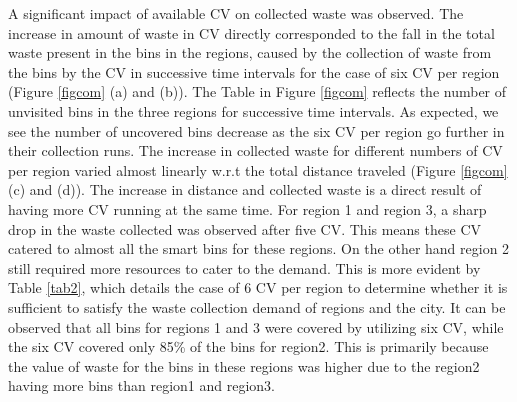 \documentclass[12pt]{article}
\begin{document}
A significant impact of available CV on collected waste was observed. The increase in amount of waste in CV directly corresponded to the fall in the total waste present in the bins in the regions, caused by the collection of waste from the bins by the CV in successive time intervals for the case of six CV per region (Figure \ref{figcom} (a) and (b)). The Table in Figure \ref{figcom} reflects the number of unvisited bins in the three regions for successive time intervals. As expected, we see the number of uncovered bins decrease as the six CV per region go further in their collection runs. The increase in collected waste for different numbers of CV per region varied almost linearly w.r.t the total distance traveled (Figure \ref{figcom} (c) and (d)). The increase in distance and collected waste is a direct result of having more CV running at the same time. For region 1 and region 3, a sharp drop in the waste collected was observed after five CV. This means these CV catered to almost all the smart bins for these regions. On the other hand region 2 still required more resources to cater to the demand. This is more evident by Table \ref{tab2}, which details the case of 6 CV per region to determine whether it is sufficient to satisfy the waste collection demand of regions and the city. It can be observed that all bins for regions 1 and 3 were covered by utilizing six CV, while the six CV covered only 85\% of the bins for region2. This is primarily because the value of waste for the bins in these regions was higher due to the region2 having more bins than region1 and region3.
\end{document}
